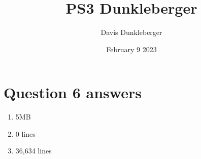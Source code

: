 \documentclass{article}
\title{PS3 Dunkleberger}
\author{Davis Dunkleberger}
\date{February 9 2023}
\begin{document}
\maketitle

\section{Question 6 answers}
\begin{enumerate}
    \item 5MB
    \item 0 lines
    \item 36,634 lines
\end{enumerate}
\end{document}
